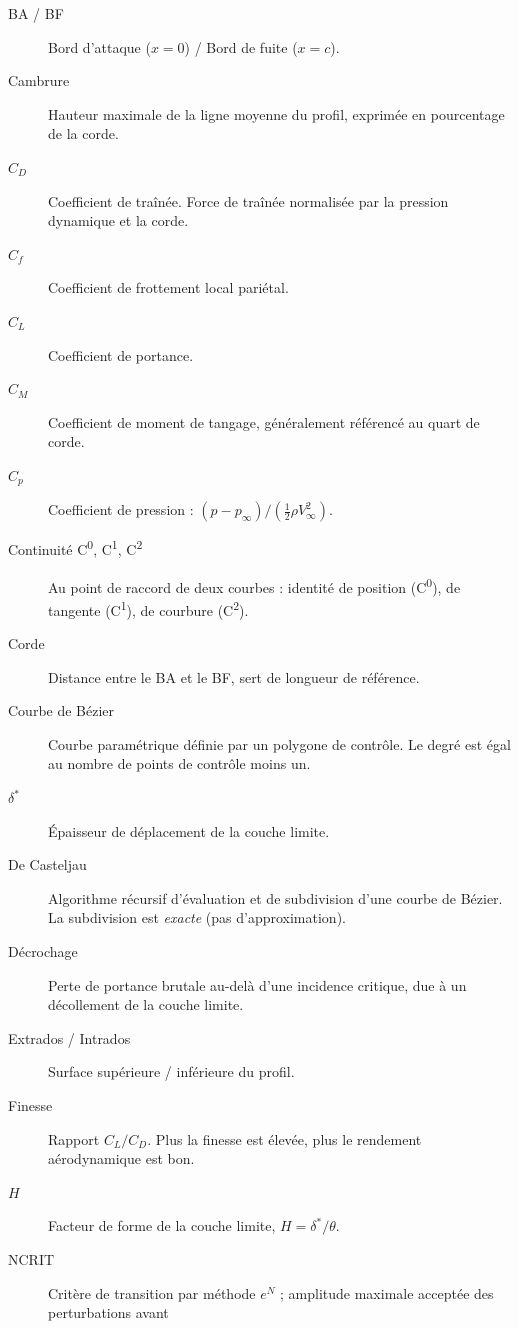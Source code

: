 \begin{description}
    \item[BA / BF] Bord d'attaque ($x=0$) / Bord de fuite ($x=c$).
    \item[Cambrure] Hauteur maximale de la ligne moyenne du profil,
        exprimée en pourcentage de la corde.
    \item[$C_D$] Coefficient de traînée. Force de traînée
        normalisée par la pression dynamique et la corde.
    \item[$C_f$] Coefficient de frottement local pariétal.
    \item[$C_L$] Coefficient de portance.
    \item[$C_M$] Coefficient de moment de tangage, généralement
        référencé au quart de corde.
    \item[$C_p$] Coefficient de pression : $(p - p_\infty) /
        (\frac{1}{2}\rho V_\infty^2)$.
    \item[Continuité C\textsuperscript{0}, C\textsuperscript{1},
        C\textsuperscript{2}] Au point de raccord de deux courbes :
        identité de position (C\textsuperscript{0}), de tangente
        (C\textsuperscript{1}), de courbure (C\textsuperscript{2}).
    \item[Corde] Distance entre le BA et le BF, sert de longueur
        de référence.
    \item[Courbe de Bézier] Courbe paramétrique définie par un
        polygone de contrôle. Le degré est égal au nombre de
        points de contrôle moins un.
    \item[$\delta^*$] Épaisseur de déplacement de la couche limite.
    \item[De Casteljau] Algorithme récursif d'évaluation et de
        subdivision d'une courbe de Bézier. La subdivision est
        \emph{exacte} (pas d'approximation).
    \item[Décrochage] Perte de portance brutale au-delà d'une
        incidence critique, due à un décollement de la couche
        limite.
    \item[Extrados / Intrados] Surface supérieure / inférieure du
        profil.
    \item[Finesse] Rapport $C_L/C_D$. Plus la finesse est élevée,
        plus le rendement aérodynamique est bon.
    \item[$H$] Facteur de forme de la couche limite,
        $H = \delta^*/\theta$.
    \item[NCRIT] Critère de transition par méthode $e^N$ ;
        amplitude maximale acceptée des perturbations avant

\end{description}

